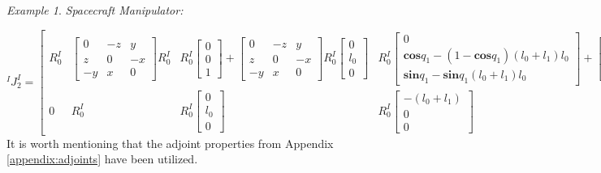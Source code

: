 \documentclass[lettersize,journal]{IEEEtran}
\def \sin {\textbf{sin}}
\def \cos {\textbf{cos}}
\theoremstyle{remark}
\newtheorem{example}{Example}[subsection]
\begin{document}
\begin{example}{ \textit{Spacecraft Manipulator:}}
\begin{strip}
\begin{equation*}
    ^IJ^I_2=\begin{bmatrix}
    R_0^I & \begin{bmatrix}
    0 & -z & y\\z & 0 & -x\\-y & x & 0\end{bmatrix} R_0^ I & R_0^ I \begin{bmatrix} 0 \\ 0 \\ 1\end{bmatrix} +\begin{bmatrix}
    0 & -z & y\\z & 0 & -x\\-y & x & 0\end{bmatrix} R_0^I \begin{bmatrix} 0 \\ l_0 \\ 0\end{bmatrix}& R_0^ I \begin{bmatrix} 0\\\cos q_1 -(1-\cos q_1)(l_0+l_1)l_0\\\sin q_1 -\sin q_1(l_0+l_1)l_0\end{bmatrix} +\begin{bmatrix}
    0 & -z & y\\z & 0 & -x\\-y & x & 0\end{bmatrix} R_0^I \begin{bmatrix} -(l_0+l_1) \\ 0 \\ 0\end{bmatrix}\\0& R_0^I & R_0^ I \begin{bmatrix} 0 \\ l_0 \\ 0\end{bmatrix} & R_0^ I \begin{bmatrix} -(l_0+l_1) \\ 0 \\ 0\end{bmatrix}
    \end{bmatrix}
\end{equation*}
It is worth mentioning that the adjoint properties from Appendix \ref{appendix:adjoints} have been utilized.
\end{strip}
\end{example}
\end{document}
